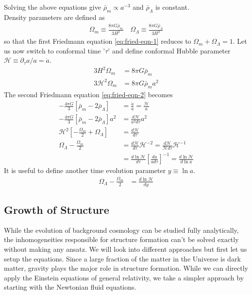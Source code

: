 \documentclass[12pt]{article}
\begin{document}
Solving the above equations give $\bar{\rho}_{m} \propto a^{-3}$ and $\bar{\rho}_{\Lambda}$ is constant.\\
Density parameters are defined as
\begin{align}
\Omega_{m} \equiv \frac{8 \pi G \bar{\rho}_{m}}{3 H^2} \quad
\Omega_{\Lambda} \equiv \frac{8 \pi G \bar{\rho}_{\Lambda}}{3 H^2}
\end{align}
%
so that the first Friedmann equation \ref{eq:fried-eqn-1} reduces to $\Omega_{m} + \Omega_{\Lambda} = 1$. Let us now switch to conformal time '$\tau$' and define conformal Hubble parameter $\mathcal{H} \equiv \partial_\tau a / a = \dot{a}$.
\begin{align}
3 H^2 \Omega_{m} &= 8 \pi G \bar{\rho}_{m}\\
3 \mathcal{H}^2 \Omega_{m} &= 8 \pi G \bar{\rho}_{m} a^2 \label{eq:omega-m-relation}
\end{align}
The second Friedmann equation \eqref{eq:fried-eqn-2} becomes 
\begin{align}
- \frac{4\pi G}{3} \left[ \bar{\rho}_{m} - 2 \bar{\rho}_{\Lambda} \right] &=  \frac{\ddot{a}}{a} = \frac{\dot{\mathcal{H}}}{a}\\
- \frac{4\pi G}{3} \left[ \bar{\rho}_{m} - 2 \bar{\rho}_{\Lambda} \right] a^2 &= \frac{d \mathcal{H}}{a^2 d\tau} a^2\\
\label{eq:fried-eqn-2-simple}
\mathcal{H}^2 \left[ - \frac{\Omega_{m}}{2} + \Omega_{\Lambda} \right] &= \frac{d \mathcal{H}}{d\tau}\\
\Omega_{\Lambda} - \frac{\Omega_{m}}{2} &= \frac{d \mathcal{H}}{d\tau} \mathcal{H}^{-2} = \frac{d \mathcal{H}}{\mathcal{H} d\tau} \mathcal{H}^{-1}\\
&= \frac{d \ln \mathcal{H}}{d\tau}
\left[ \frac{da}{a d\tau} \right]^{-1} = \frac{d \ln \mathcal{H}}{d \ln a}
\end{align} 
It is useful to define another time evolution parameter $y \equiv \ln a$.
\begin{align}
\Omega_{\Lambda} - \frac{\Omega_{m}}{2} &= \frac{d \ln \mathcal{H}}{d y} 
\end{align}

\subsection{Growth of Structure}
While the evolution of background cosmology can be studied fully analytically, the inhomogeneities responsible for structure formation can't be solved exactly without making any ansatz. We will look into different approaches but first let us setup the equations. Since a large fraction of the matter in the Universe is dark matter, gravity plays the major role in structure formation. While we can directly apply the Einstein equations of general relativity, we take a simpler approach by starting with the Newtonian fluid equations.
\end{document}
